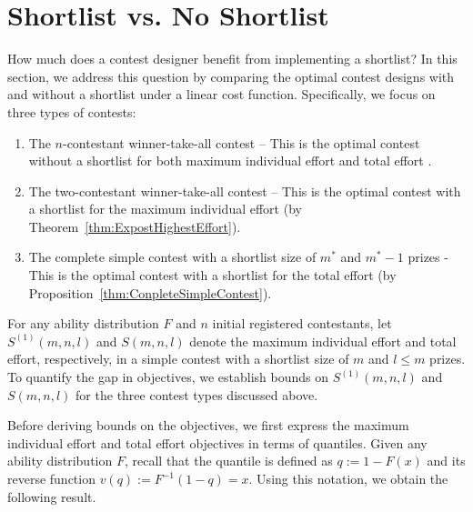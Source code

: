 \section{Shortlist vs. No Shortlist}
\label{sec: compare}
How much does a contest designer benefit from implementing a shortlist? In this section, we address this question by comparing the optimal contest designs with and without a shortlist under a linear cost function. Specifically, we focus on three types of contests:
\begin{enumerate}
    \item The $n$-contestant winner-take-all contest – This is the optimal contest without a shortlist for both maximum individual effort and total effort \cite{MS01,CHS19}.
    \item The two-contestant winner-take-all contest – This is the optimal contest with a shortlist for the maximum individual effort (by Theorem~\ref{thm:ExpostHighestEffort}).
    \item The complete simple contest with a shortlist size of $m^*$ and $m^*-1$ prizes - This is the optimal contest with a shortlist for the total effort (by Proposition~\ref{thm:ConpleteSimpleContest}).
\end{enumerate}

For any ability distribution $F$ and $n$ initial registered contestants, let $S^{(1)}(m,n,l)$ and $S(m,n,l)$ denote the maximum individual effort and total effort, respectively, in a simple contest with a shortlist size of $m$ and $l\leq m$ prizes. To quantify the gap in objectives, we establish bounds on $S^{(1)}(m,n,l)$ and $S(m,n,l)$ for the three contest types discussed above.

Before deriving bounds on the objectives, we first express the maximum individual effort and total effort objectives in terms of quantiles. Given any ability distribution $F$, recall that the quantile is defined as $q:=1-F(x)$ and its reverse function $v(q):=F^{-1}(1-q)=x$. Using this notation, we obtain the following result.

